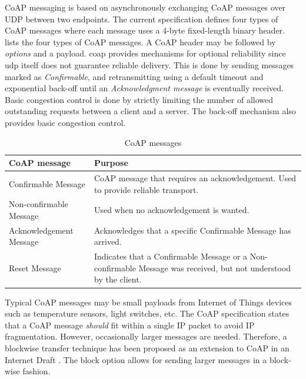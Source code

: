CoAP messaging is based on asynchronously exchanging CoAP messages over UDP
between two endpoints. The current specification defines four types of CoAP
messages where each message uses a 4-byte fixed-length binary header.
 lists the four types of CoAP messages. A CoAP header
may be followed by \textit{options} and a payload. \Gls{coap} provides
mechanisms for optional reliability since \gls{udp} itself does not guarantee
reliable delivery. This is done by sending messages marked as
\textit{Confirmable}, and retransmitting using a default timeout and exponential
back-off until an \textit{Acknowledgment message} is eventually received. Basic
congestion control is done by strictly limiting the number of allowed
outstanding requests between a client and a server. The back-off mechanism also
provides basic congestion control.

\begin{table}[h]
\centering
\begin{tabularx}{\textwidth}{|X|X|}
\hline
\textbf{CoAP message}   & \textbf{Purpose}                                                                                                  \\ \hline
Confirmable Message     & CoAP message that  requires an acknowledgement. Used to provide reliable transport.                               \\ \hline
Non-confirmable Message & Used when no acknowledgement is wanted.                                                                           \\ \hline
Acknowledgement Message & Acknowledges that a specific Confirmable Message has arrived.                                                     \\ \hline
Reset Message           & Indicates that a Confirmable Message or a Non-confirmable Message was received, but not understood by the client. \\ \hline
\end{tabularx}

\caption{CoAP messages}
\label{table:coap-messages}
\end{table}

Typical CoAP messages may be small payloads from Internet of Things devices such
as temperature sensors, light switches, etc. The CoAP specification states that
a CoAP message \textit{should} fit within a single IP packet to avoid IP
fragmentation. However, occasionally larger messages are needed. Therefore, a
blockwise transfer technique has been proposed as an extension to CoAP in an
Internet Draft \cite{draft-coap-blockwise}. The block option allows for sending
larger messages in a block-wise fashion.

